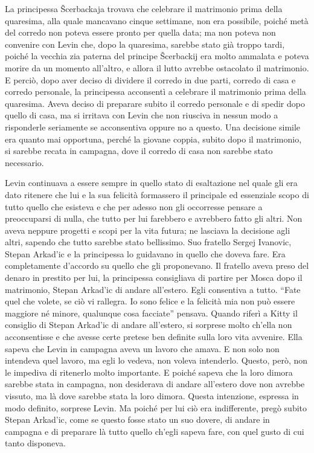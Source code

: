 \label{parte-quinta} 
\pagestyle{pagina}

\label{i-4} 

La principessa Šcerbackaja trovava che celebrare il matrimonio prima della quaresima, alla quale mancavano cinque settimane, non era possibile, poiché metà del corredo non poteva essere pronto per quella data; ma non poteva non convenire con Levin che, dopo la quaresima, sarebbe stato già troppo tardi, poiché la vecchia zia paterna del principe Šcerbackij era molto ammalata e poteva morire da un momento all'altro, e allora il lutto avrebbe ostacolato il matrimonio. E perciò, dopo aver deciso di dividere il corredo in due parti, corredo di casa e corredo personale, la principessa acconsentì a celebrare il matrimonio prima della quaresima. Aveva deciso di preparare subito il corredo personale e di spedir dopo quello di casa, ma si irritava con Levin che non riusciva in nessun modo a risponderle seriamente se acconsentiva oppure no a questo. Una decisione simile era quanto mai opportuna, perché la giovane coppia, subito dopo il matrimonio, si sarebbe recata in campagna, dove il corredo di casa non sarebbe stato necessario. 

Levin continuava a essere sempre in quello stato di esaltazione nel quale gli era dato ritenere che lui e la sua felicità formassero il principale ed essenziale scopo di tutto quello che esisteva e che per adesso non gli occorresse pensare a preoccuparsi di nulla, che tutto per lui farebbero e avrebbero fatto gli altri. Non aveva neppure progetti e scopi per la vita futura; ne lasciava la decisione agli altri, sapendo che tutto sarebbe stato bellissimo. Suo fratello Sergej Ivanovic, Stepan Arkad'ic e la principessa lo guidavano in quello che doveva fare. Era completamente d'accordo su quello che gli proponevano. Il fratello aveva preso del denaro in prestito per lui, la principessa consigliava di partire per Mosca dopo il matrimonio, Stepan Arkad'ic di andare all'estero. Egli consentiva a tutto. ``Fate quel che volete, se ciò vi rallegra. Io sono felice e la felicità mia non può essere maggiore né minore, qualunque cosa facciate'' pensava. Quando riferì a Kitty il consiglio di Stepan Arkad'ic di andare all'estero, si sorprese molto ch'ella non acconsentisse e che avesse certe pretese ben definite sulla loro vita avvenire. Ella sapeva che Levin in campagna aveva un lavoro che amava. E non solo non intendeva quel lavoro, ma egli lo vedeva, non voleva intenderlo. Questo, però, non le impediva di ritenerlo molto importante. E poiché sapeva che la loro dimora sarebbe stata in campagna, non desiderava di andare all'estero dove non avrebbe vissuto, ma là dove sarebbe stata la loro dimora. Questa intenzione, espressa in modo definito, sorprese Levin. Ma poiché per lui ciò era indifferente, pregò subito Stepan Arkad'ic, come se questo fosse stato un suo dovere, di andare in campagna e di preparare là tutto quello ch'egli sapeva fare, con quel gusto di cui tanto disponeva. 
\enlargethispage*{1\baselineskip}

